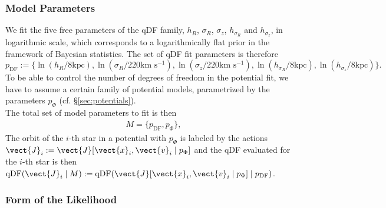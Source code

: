 \subsubsection{Model Parameters} \label{kap:modpar}

We fit the five free parameters of the qDF family, $h_R$, $\sigma_R$, $\sigma_z$, $h_{\sigma_R}$ and $h_{\sigma_z}$, in logarithmic scale, which corresponds to a logarithmically flat prior in the framework of Bayesian statistics. The set of qDF fit parameters is therefore 
\begin{equation*}
p_\text{DF} := \{ \ln \left(h_R/8\text{kpc}\right), \ln \left(\sigma_R/220\text{km s$^{-1}$}\right), \ln \left(\sigma_z/220\text{km s$^{-1}$}\right), \ln \left(h_{\sigma_R}/8\text{kpc}\right), \ln \left(h_{\sigma_z}/8\text{kpc}\right)\} .
\end{equation*}
To be able to control the number of degrees of freedom in the potential fit, we have to assume a certain family of potential models, parametrized by the parameters $p_\Phi$ (cf. \S\ref{sec:potentials}). 
\\The total set of model parameters to fit is then
\begin{eqnarray*}
M =\{ p_\text{DF} , p_\Phi \},
\end{eqnarray*}
The orbit of the $i$-th star in a potential with $p_\Phi$ is labeled by the actions $\vect{J}_i := \vect{J}[\vect{x}_i,\vect{v}_i\mid p_{\Phi}]$ and the qDF evaluated for the $i$-th star is then $\text{qDF}(\vect{J}_i \mid M) := \text{qDF}(\vect{J}[\vect{x}_i,\vect{v}_i\mid p_{\Phi}] \mid p_\text{DF})$.

\subsubsection{Form of the Likelihood} 

